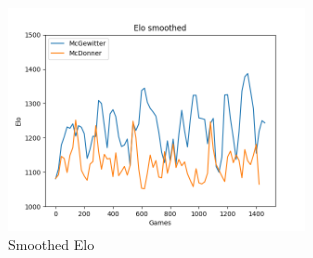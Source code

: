 \begin{figure}[h]
	\centering
	\includegraphics[width=0.7\textwidth]{images/Smoothed-Elo-Time.png}
	\caption{Smoothed Elo}
	\label{fig:elo-smoothed}
\end{figure}
 